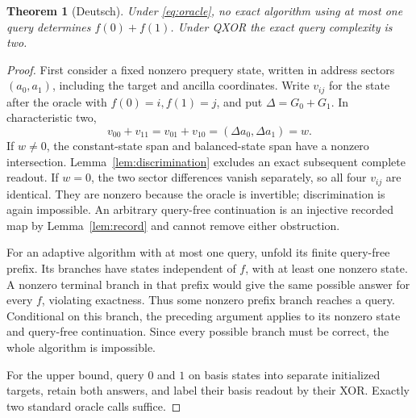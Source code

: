 \documentclass[11pt]{article}
\newtheorem{theorem}{Theorem}[section]
\begin{document}
\begin{theorem}[Deutsch]\label{thm:deutsch}
Under \eqref{eq:oracle}, no exact algorithm using at most one query determines $f(0)+f(1)$. Under QXOR the exact query complexity is two.
\end{theorem}
\begin{proof}
First consider a fixed nonzero prequery state, written in address sectors $(a_0,a_1)$, including the target and ancilla coordinates. Write $v_{ij}$ for the state after the oracle with $f(0)=i,f(1)=j$, and put $\Delta=G_0+G_1$. In characteristic two,
\[
 v_{00}+v_{11}=v_{01}+v_{10}
   =(\Delta a_0,\Delta a_1)=w.
\]
If $w\ne0$, the constant-state span and balanced-state span have a nonzero intersection. Lemma~\ref{lem:discrimination} excludes an exact subsequent complete readout. If $w=0$, the two sector differences vanish separately, so all four $v_{ij}$ are identical. They are nonzero because the oracle is invertible; discrimination is again impossible. An arbitrary query-free continuation is an injective recorded map by Lemma~\ref{lem:record} and cannot remove either obstruction.

For an adaptive algorithm with at most one query, unfold its finite query-free prefix. Its branches have states independent of $f$, with at least one nonzero state. A nonzero terminal branch in that prefix would give the same possible answer for every $f$, violating exactness. Thus some nonzero prefix branch reaches a query. Conditional on this branch, the preceding argument applies to its nonzero state and query-free continuation. Since every possible branch must be correct, the whole algorithm is impossible.

For the upper bound, query $0$ and $1$ on basis states into separate initialized targets, retain both answers, and label their basis readout by their XOR. Exactly two standard oracle calls suffice.
\end{proof}
\end{document}
